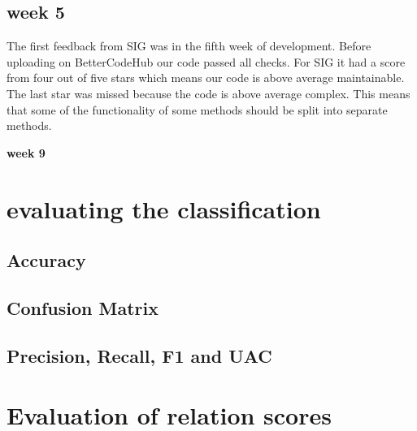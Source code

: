 \subsection{week 5}
The first feedback from SIG was in the fifth week of development. Before uploading on BetterCodeHub our code passed all checks. For SIG it had a score from four out of five stars which means our code is above average maintainable. The last star was missed because the code is above average complex. This means that some of the functionality of some methods should be split into separate methods.

\textbf{week 9} \\

\section{evaluating the classification}

\subsection{Accuracy}

\subsection{Confusion Matrix}

\subsection{Precision, Recall, F1 and UAC}

\section{Evaluation of relation scores}


